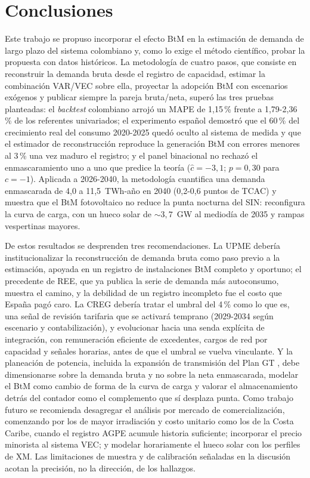 \documentclass[11pt,letterpaper]{article}
\begin{document}
\section{Conclusiones}

Este trabajo se propuso incorporar el efecto BtM en la estimación de demanda
de largo plazo del sistema colombiano y, como lo exige el método científico,
probar la propuesta con datos históricos. La metodología de cuatro pasos, que consiste en reconstruir la demanda bruta
desde el registro de capacidad, estimar la combinación VAR/VEC sobre ella,
proyectar la adopción BtM con escenarios exógenos y publicar siempre la
pareja bruta/neta, superó las tres pruebas
planteadas: el \emph{backtest} colombiano arrojó un MAPE de 1,15\,\% frente
a 1,79-2,36\,\% de los referentes univariados; el experimento español
demostró que el 60\,\% del crecimiento real del consumo 2020-2025 quedó
oculto al sistema de medida y que el estimador de reconstrucción reproduce
la generación BtM con errores menores al 3\,\% una vez maduro el registro; y
el panel binacional no rechazó el enmascaramiento uno a uno que predice la
teoría ($\hat{c}=-3{,}1$; $p=0{,}30$ para $c=-1$). Aplicada a 2026-2040, la
metodología cuantifica una demanda enmascarada de 4,0 a 11,5~TWh-año en 2040
(0,2-0,6 puntos de TCAC) y muestra que el BtM fotovoltaico no reduce la
punta nocturna del SIN: reconfigura la curva de carga, con un hueco solar de
${\sim}3{,}7$~GW al mediodía de 2035 y rampas vespertinas mayores.

De estos resultados se desprenden tres recomendaciones. La UPME debería
institucionalizar la reconstrucción de demanda bruta como paso previo a la
estimación, apoyada en un registro de instalaciones BtM completo y oportuno;
el precedente de REE, que ya publica la serie de demanda más autoconsumo,
muestra el camino, y la debilidad de un registro incompleto fue el costo que
España pagó caro. La
CREG debería tratar el umbral del 4\,\% como lo que es, una señal de
revisión tarifaria que se activará temprano (2029-2034 según escenario y
contabilización), y evolucionar hacia una senda explícita de integración, con remuneración
eficiente de excedentes, cargos de red por capacidad y señales horarias,
antes de que el umbral se vuelva vinculante. Y la
planeación de potencia, incluida la expansión de transmisión del Plan GT
\cite{plangt2016}, debe dimensionarse sobre la demanda bruta y no sobre la
neta enmascarada, modelar el BtM como cambio de forma de la curva de carga y
valorar el almacenamiento detrás del contador como el complemento que sí
desplaza punta. Como trabajo futuro se recomienda desagregar el análisis por
mercado de comercialización, comenzando por los de mayor irradiación y costo
unitario como los de la Costa Caribe, cuando el registro AGPE acumule
historia suficiente; incorporar el precio minorista al sistema VEC; y
modelar horariamente el hueco solar con los perfiles de XM. Las limitaciones
de muestra y de calibración señaladas en la discusión acotan la precisión,
no la dirección, de los hallazgos.
\end{document}
